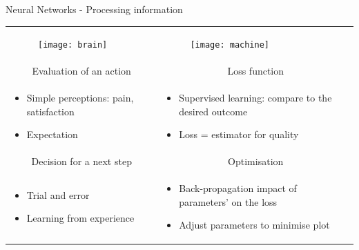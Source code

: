 \begin{frame}{Neural Networks - Processing information}
\begin{tabular}{p{5cm}|p{5cm}}
    \begin{figure}
    	\texttt{[image: brain]}
    \end{figure}
    & 
    \begin{figure}
    	\texttt{[image: machine]}
    \end{figure} \\
  \multicolumn{1}{c|}{Evaluation of an action} & \multicolumn{1}{c}{Loss function} \\
    \begin{itemize}
        \item Simple perceptions: pain, satisfaction
        \item Expectation
    \end{itemize}
    & 
    \begin{itemize}
      \item Supervised learning: compare to the desired outcome
      \item Loss = estimator for quality
    \end{itemize} \\
\multicolumn{1}{c|}{Decision for a next step} & \multicolumn{1}{c}{Optimisation} \\
    \begin{itemize}
        \item Trial and error
        \item Learning from experience
    \end{itemize}
    & 
    \begin{itemize}
      \item Back-propagation impact of parameters' on the loss
      \item Adjust parameters to minimise plot
    \end{itemize} 
 \end{tabular}
\end{frame}




